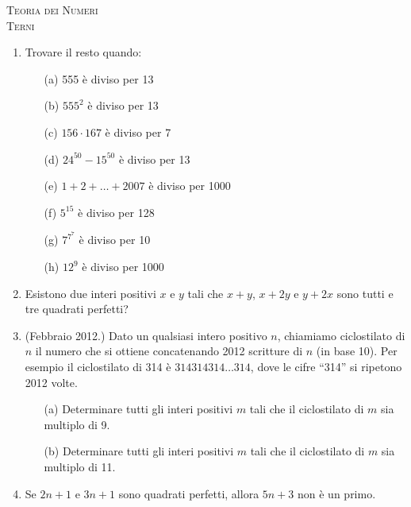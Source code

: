 \documentclass[a4paper]{article}
\theoremstyle{remark}
\theoremstyle{definition}
\begin{document}
\begin{center}
	\vspace*{0,5 cm}
	{\Huge \textsc{Teoria dei Numeri}} \\
	\vspace{0,5 cm}
	\textsc{Terni}
	\thispagestyle{empty}
	\vspace{0,7 cm}
\end{center}
\normalsize




\begin{enumerate}
	\item Trovare il resto quando:
	\begin{itemize}
		\item [(a)] 555 è diviso per 13
		\item [(b)] $ 555^2$ è diviso per 13
		\item [(c)] $ 156 \cdot 167 $ è diviso per 7
		\item [(d)] $ 24^{50} - 15^{50} $ è diviso per 13
		\item [(e)] $ 1 + 2 + \dots + 2007 $ è diviso per 1000
		\item [(f)] $ 5^{15} $ è diviso per 128
		\item [(g)]$  7^{7^7} $ è diviso per 10
		\item [(h)] $ 12^9 $ è diviso per 1000 \\
	\end{itemize}
	
	\item Esistono due interi positivi $ x $ e $ y $ tali che $ x+y $, $ x+2y $ e $ y+2x $ sono tutti e tre quadrati perfetti? \\
	
	\item (Febbraio 2012.) Dato un qualsiasi intero positivo $ n $, chiamiamo ciclostilato di $ n $ il numero che si ottiene concatenando 2012 scritture di $ n $ (in base 10). Per esempio il ciclostilato di 314 è $ 314314314\dots314 $, dove le cifre “314” si ripetono 2012 volte.
	\begin{itemize}
		\item [(a)] Determinare tutti gli interi positivi $ m $ tali che il ciclostilato di $ m $ sia multiplo di 9.
		\item [(b)] Determinare tutti gli interi positivi $ m $ tali che il ciclostilato di $ m $ sia multiplo di 11. \\
	\end{itemize}
	
	\item Se $ 2n + 1 $ e $ 3n + 1 $ sono quadrati perfetti, allora $ 5n + 3 $ non è un primo. \\
	

\end{enumerate}
\end{document}
